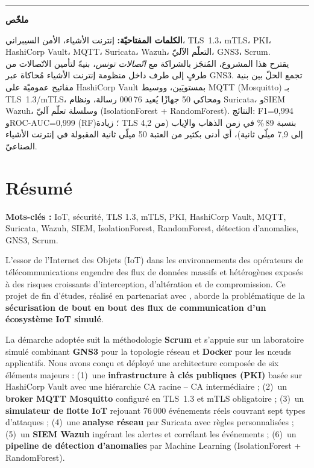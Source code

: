 \vspace{6pt}\hrule\vspace{6pt}

\noindent\textbf{\large \textarabic{ملخّص}}\\[2pt]
\begin{Arabic}
\textbf{الكلمات المفتاحيّة:} إنترنت الأشياء، الأمن السيبراني، TLS~1.3، mTLS، PKI، HashiCorp Vault، MQTT، Suricata، Wazuh، التعلّم الآليّ، GNS3، Scrum.\\[2pt]
يقترح هذا المشروع، المُنجَز بالشراكة مع \emph{اتّصالات تونس}، بنيةً لتأمين الاتّصالات من طرفٍ إلى طرف داخل منظومة إنترنت الأشياء مُحاكاة عبر GNS3. تجمع الحلّ بين بنية مفاتيح عموميّة على HashiCorp Vault بمستويَين، ووسيط MQTT (Mosquitto) بـ TLS~1.3/mTLS، ومحاكي 50 جهازًا يُعيد 76\,000 رسالة، ونظام Suricata، وSIEM Wazuh، وسلسلة تعلّم آليّ (IsolationForest + RandomForest). النتائج: F1=0,994 وROC-AUC=0,999 (RF)؛ زيادة TLS بنسبة 89\,\% في زمن الذهاب والإياب (من 4,2 إلى 7,9 ميلّي ثانية)، أي أدنى بكثير من العتبة 50 ميلّي ثانية المقبولة في إنترنت الأشياء الصناعيّ.
\end{Arabic}

\endgroup
\cleardoublepage
\chapter*{Résumé}

\noindent\textbf{Mots-clés :} IoT, sécurité, TLS 1.3, mTLS, PKI, HashiCorp Vault, MQTT, Suricata, Wazuh, SIEM, IsolationForest, RandomForest, détection d'anomalies, GNS3, Scrum.

\noindent L'essor de l'Internet des Objets (IoT) dans les environnements des opérateurs de télécommunications engendre des flux de données massifs et hétérogènes exposés à des risques croissants d'interception, d'altération et de compromission. Ce projet de fin d'études, réalisé en partenariat avec \TT{}, aborde la problématique de la \textbf{sécurisation de bout en bout des flux de communication d'un écosystème IoT simulé}.

\noindent La démarche adoptée suit la méthodologie \textbf{Scrum} et s'appuie sur un laboratoire simulé combinant \textbf{GNS3} pour la topologie réseau et \textbf{Docker} pour les nœuds applicatifs. Nous avons conçu et déployé une architecture composée de six éléments majeurs : (1)~une \textbf{infrastructure à clés publiques (PKI)} basée sur HashiCorp Vault avec une hiérarchie CA racine -- CA intermédiaire ; (2)~un \textbf{broker MQTT Mosquitto} configuré en TLS~1.3 et mTLS obligatoire ; (3)~un \textbf{simulateur de flotte IoT} rejouant 76\,000 événements réels couvrant sept types d'attaques ; (4)~une \textbf{analyse réseau} par Suricata avec règles personnalisées ; (5)~un \textbf{SIEM Wazuh} ingérant les alertes et corrélant les événements ; (6)~un \textbf{pipeline de détection d'anomalies} par Machine Learning (IsolationForest + RandomForest).

